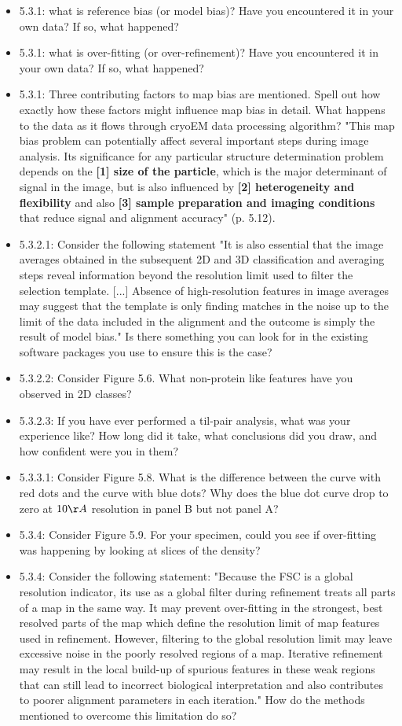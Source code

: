 \documentclass[11pt, oneside]{article}   	%
\begin{document}
\begin{itemize}
	\item 5.3.1: what is reference bias (or model bias)? Have you encountered it in your own data? If so, what happened?
	\item 5.3.1: what is over-fitting (or over-refinement)? Have you encountered it in your own data? If so, what happened?
	\item 5.3.1: Three contributing factors to map bias are mentioned. Spell out how exactly how these factors might influence map bias in detail. What happens to the data as it flows through cryoEM data processing algorithm? "This map bias problem can potentially affect several important steps during image analysis. Its significance for any particular structure determination problem depends on the {\bf [1] size of the particle}, which is the major determinant of signal in the image, but is also influenced by {\bf [2] heterogeneity and flexibility} and also {\bf [3] sample preparation and imaging conditions} that reduce signal and alignment accuracy" (p. 5.12).
	\item 5.3.2.1: Consider the following statement "It is also essential that the image averages obtained in the subsequent 2D and 3D classification and averaging steps reveal information beyond the resolution limit used to filter the selection template. [...] Absence of high-resolution features in image averages may suggest that the template is only finding matches in the noise up to the limit of the data included in the alignment and the outcome is simply the result of model bias." Is there something you can look for in the existing software packages you use to ensure this is the case? 
	\item 5.3.2.2: Consider Figure 5.6. What non-protein like features have you observed in 2D classes?
	\item 5.3.2.3: If you have ever performed a til-pair analysis, what was your experience like? How long did it take, what conclusions did you draw, and how confident were you in them?
	\item 5.3.3.1: Consider Figure 5.8. What is the difference between the curve with red dots and the curve with blue dots? Why does the blue dot curve drop to zero at $10  \AA$ resolution in panel B but not panel A?
	\item 5.3.4: Consider Figure 5.9. For your specimen, could you see if over-fitting was happening by looking at slices of the density? 
	\item 5.3.4: Consider the following statement: "Because the FSC is a global resolution indicator, its use as a global filter during refinement treats all parts of a map in the same way. It may prevent over-fitting in the strongest, best resolved parts of the map which define the resolution limit of map features used in refinement. However, filtering to the global resolution limit may leave excessive noise in the poorly resolved regions of a map. Iterative refinement may result in the local build-up of spurious features in these weak regions that can still lead to incorrect biological interpretation and also contributes to poorer alignment parameters in each iteration." How do the methods mentioned to overcome this limitation do so?
	
\end{itemize}
\end{document}
